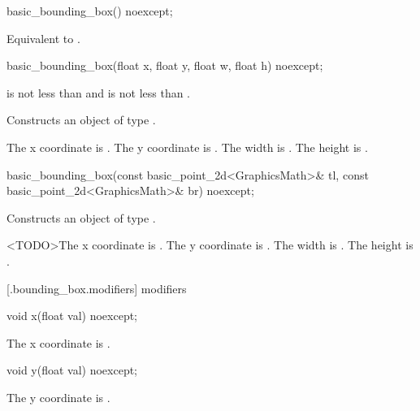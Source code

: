 %
\begin{itemdecl}
basic_bounding_box() noexcept;
\end{itemdecl}
\begin{itemdescr}
\pnum
\effects
Equivalent to .
\end{itemdescr}

%
\begin{itemdecl}
basic_bounding_box(float x, float y, float w, float h) noexcept;
\end{itemdecl}
\begin{itemdescr}
\pnum
\requires
{} is not less than  and  is not less than .

\pnum
\effects
Constructs an object of type .

\pnum
The x coordinate is . The y coordinate is . The width is . The height is .
\end{itemdescr}

%
\begin{itemdecl}
basic_bounding_box(const basic_point_2d<GraphicsMath>& tl,
  const basic_point_2d<GraphicsMath>& br) noexcept;
\end{itemdecl}
\begin{itemdescr}
\pnum
\effects
Constructs an object of type .

\pnum
<TODO>The x coordinate is . The y coordinate is . The width is . The height is .
\end{itemdescr}

 [\iotwod.bounding_box.modifiers]{ modifiers}

%
\begin{itemdecl}
void x(float val) noexcept;
\end{itemdecl}

\begin{itemdescr}
\pnum
\effects
The x coordinate is .
\end{itemdescr}

%
\begin{itemdecl}
void y(float val) noexcept;
\end{itemdecl}
\begin{itemdescr}
\pnum
\effects
The y coordinate is .
\end{itemdescr}

